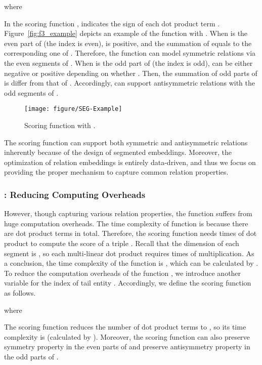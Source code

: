 \documentclass[11pt,a4paper]{article}
\begin{document}
where

In the scoring function ,  indicates the sign of each dot product term . 
Figure~\ref{fig:f3_example} depicts an example of the function  with .
When  is the even part of  (the index  is even),  is positive, and the summation  of  equals to the corresponding one  of .
Therefore, the function  can model symmetric relations via the even segments of .
When  is the odd part of  (the index  is odd),  can be either negative or positive depending on whether .
Then, the summation of odd parts of  is differ from that of .
Accordingly,  can support antisymmetric relations with the odd segments of . 

\begin{figure}[!h]
	\centering
	\texttt{[image: figure/SEG-Example]}
	\caption{Scoring function  with .}
	\label{fig:embedding_example}
\end{figure}

The scoring function  can support both symmetric and antisymmetric relations inherently because of the design of segmented embeddings.
Moreover, the optimization of relation embeddings is entirely data-driven, and thus we focus on providing the proper mechanism to capture common relation properties.

\subsubsection{: Reducing Computing Overheads}
However, though capturing various relation properties, the function  suffers from huge computation overheads.
The time complexity of function  is  because there are  dot product terms  in total.
Therefore, the scoring function  needs  times of dot product to compute the score of a triple .
Recall that the dimension of each segment is , so each multi-linear dot product requires  times of multiplication.
As a conclusion, the time complexity of the function  is , which can be calculated by .
To reduce the computation overheads of the function , we introduce another variable  for the index of tail entity .
Accordingly, we define the scoring function  as follows.

where

The scoring function  reduces the number of dot product terms to , so its time complexity is  (calculated by ).
Moreover, the scoring function  can also preserve symmetry property in the even parts of  and preserve antisymmetry property in the odd parts of . 
\end{document}
